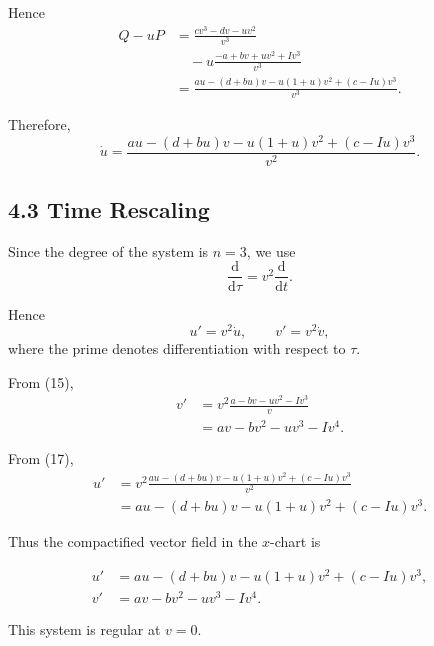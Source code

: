 \documentclass[11pt,a4paper]{article}
\newcommand{\dd}{\mathrm{d}}
\begin{document}
Hence
\begin{align}
Q-uP
&=
\frac{cv^3-dv-uv^2}{v^3}\\
&\quad
-
u
\frac{-a+bv+uv^2+Iv^3}{v^3}\\
&=
\frac{
au-(d+bu)v-u(1+u)v^2+(c-Iu)v^3
}{v^3}.
\end{align}

Therefore,
\begin{equation}
\boxed{
\dot u
=
\frac{
au-(d+bu)v-u(1+u)v^2+(c-Iu)v^3
}{v^2}.
}
\tag{17}
\end{equation}

\subsection{4.3 Time Rescaling}

Since the degree of the system is $n=3$, we use
\begin{equation}
\boxed{
\frac{\dd}{\dd\tau}
=
v^2\frac{\dd}{\dd t}.
}
\tag{18}
\end{equation}

Hence
\begin{equation}
u'=v^2\dot u,
\qquad
v'=v^2\dot v,
\end{equation}
where the prime denotes differentiation with respect to $\tau$.

From (15),
\begin{align}
v'
&=
v^2
\frac{a-bv-uv^2-Iv^3}{v}\\
&=
av-bv^2-uv^3-Iv^4.
\end{align}

From (17),
\begin{align}
u'
&=
v^2
\frac{
au-(d+bu)v-u(1+u)v^2+(c-Iu)v^3
}{v^2}\\
&=
au-(d+bu)v-u(1+u)v^2+(c-Iu)v^3.
\end{align}

Thus the compactified vector field in the $x$-chart is

\begin{equation}
\boxed{
\begin{aligned}
u'
&=
au-(d+bu)v-u(1+u)v^2+(c-Iu)v^3,
\\[1mm]
v'
&=
av-bv^2-uv^3-Iv^4.
\end{aligned}}
\tag{19}
\end{equation}

This system is regular at $v=0$.

\end{document}
